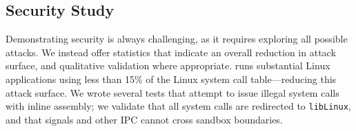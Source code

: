



\subsection{Security Study}

Demonstrating security is always challenging, as it requires exploring all possible attacks.
We instead offer statistics that indicate an overall reduction in attack surface,
and qualitative validation where appropriate.
\sysname{} runs substantial Linux applications using less than 15\% of the
Linux system call table---reducing this attack surface.
We wrote several tests that attempt to issue illegal system calls with inline assembly;
we validate that all system calls are redirected to {\tt libLinux},
and that signals and other IPC cannot cross sandbox boundaries.






